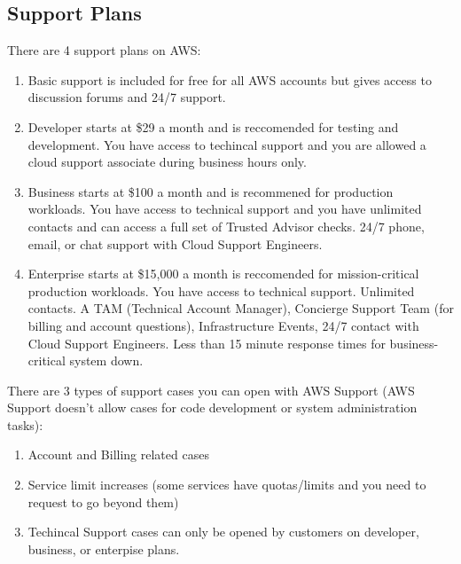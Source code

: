\documentclass{article}%
\begin{document}
\subsection{Support Plans}
There are 4 support plans on AWS:
\begin{enumerate}
    \item Basic support is included for free for all AWS accounts but gives access to discussion forums and 24/7 support.
    \item Developer starts at \$29 a month and is reccomended for testing and development. You have access to techincal support and you are allowed a cloud support associate during business hours only.
    \item Business starts at \$100 a month and is recommened for production workloads. You have access to technical support  and you have unlimited contacts and can access a full set of Trusted Advisor checks. 24/7 phone, email, or chat support with Cloud Support Engineers. 
    \item Enterprise starts at \$15,000 a month is reccomended for mission-critical production workloads. You have access to technical support. Unlimited contacts. A TAM (Technical Account Manager), Concierge Support Team (for billing and account questions), Infrastructure Events, 24/7 contact with Cloud Support Engineers. Less than 15 minute response times for business-critical system down.
\end{enumerate}
There are 3 types of support cases you can open with AWS Support (AWS Support doesn't allow cases for code development or system administration tasks):
\begin{enumerate}
    \item Account and Billing related cases
    \item Service limit increases (some services have quotas/limits and you need to request to go beyond them)
    \item Techincal Support cases can only be opened by customers on developer, business, or enterpise plans. 
\end{enumerate}
\end{document}
